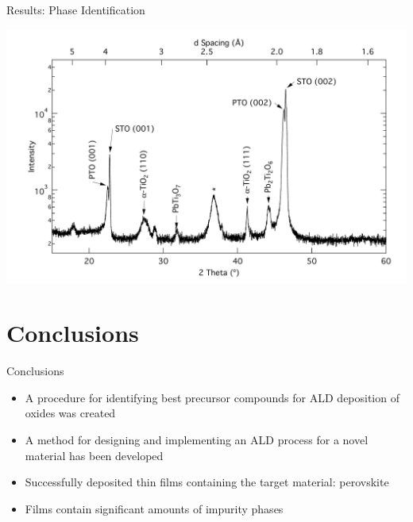 \documentclass[professionalfont]{beamer}
\begin{document}
\begin{frame}{Results: Phase Identification}
\begin{overprint}
\begin{center}
		\centerline{\includegraphics[width=\textwidth]{./graphics/data/xrd/28STO}}
		\end{center}
\end{overprint}
\end{frame}


\section{Conclusions}

\begin{frame}{Conclusions}
\large
\begin{itemize}
\item A procedure for identifying best precursor compounds for ALD deposition of oxides was created
\vspace{1.5em}
\item A method for designing and implementing an ALD process for a novel material has been developed
\vspace{1.5em}
\item Successfully deposited thin films containing the target material: perovskite 
\vspace{1.5em}
\item Films contain significant amounts of impurity phases
\end{itemize}
\end{frame}
\end{document}
